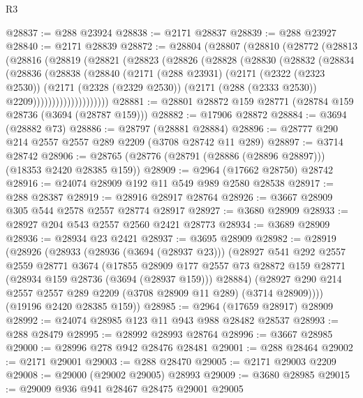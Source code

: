 \begin{lexlean}{R3}
\begin{coremodule}
@28837 := @288 @23924
@28838 := @2171 @28837
@28839 := @288 @23927
@28840 := @2171 @28839
@28872 := @28804
    (@28807
      (@28810
        (@28772
          (@28813
            (@28816
              (@28819
                (@28821
                  (@28823
                    (@28826
                      (@28828
                        (@28830
                          (@28832
                            (@28834
                              (@28836
                                (@28838
                                  (@28840
                                    (@2171
                                      (@288 @23931)
                                      (@2171
                                        (@2322 (@2323 @2530))
                                        (@2171
                                          (@2328 (@2329 @2530))
                                          (@2171 (@288 (@2333 @2530)) @2209))))))))))))))))))))
@28881 := @28801 @28872 @159 @28771 (@28784 @159 @28736 (@3694 (@28787 @159)))
@28882 := @17906 @28872
@28884 := @3694 (@28882 @73)
@28886 := @28797 (@28881 @28884)
@28896 := @28777 @290 @214 @2557 @2557 @289 @2209 (@3708 @28742 @11 @289)
@28897 := @3714 @28742
@28906 := @28765 (@28776 (@28791 (@28886 (@28896 @28897))) (@18353 @2420 @28385 @159))
@28909 := @2964 (@17662 @28750) @28742
@28916 := @24074 @28909 @192 @11 @549 @989 @2580 @28538
@28917 := @288 @28387
@28919 := @28916 @28917 @28764
@28926 := @3667 @28909 @305 @544 @2578 @2557 @28774 @28917
@28927 := @3680 @28909
@28933 := @28927 @204 @543 @2557 @2560 @2421 @28773
@28934 := @3689 @28909
@28936 := @28934 @23 @2421
@28937 := @3695 @28909
@28982 := @28919
    (@28926
      (@28933
        (@28936 (@3694 (@28937 @23)))
        (@28927
          @541
          @292
          @2557
          @2559
          @28771
          @3674
          (@17855
            @28909
            @177
            @2557
            @73
            @28872
            @159
            @28771
            (@28934 @159 @28736 (@3694 (@28937 @159)))
            @28884)
          (@28927 @290 @214 @2557 @2557 @289 @2209 (@3708 @28909 @11 @289) (@3714 @28909))))
      (@19196 @2420 @28385 @159))
@28985 := @2964 (@17659 @28917) @28909
@28992 := @24074 @28985 @123 @11 @943 @988 @28482 @28537
@28993 := @288 @28479
@28995 := @28992 @28993 @28764
@28996 := @3667 @28985
@29000 := @28996 @278 @942 @28476 @28481
@29001 := @288 @28464
@29002 := @2171 @29001
@29003 := @288 @28470
@29005 := @2171 @29003 @2209
@29008 := @29000 (@29002 @29005) @28993
@29009 := @3680 @28985
@29015 := @29009 @936 @941 @28467 @28475 @29001 @29005

\end{coremodule}
\end{lexlean}
